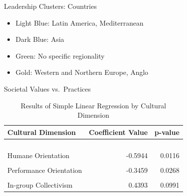 \documentclass[
  ignorenonframetext,
]{beamer}
\providecommand{\tightlist}{%
  \setlength{\itemsep}{0pt}\setlength{\parskip}{0pt}}
\begin{document}
\begin{frame}{Leadership Clusters: Countries}
\protect\hypertarget{leadership-clusters-countries-1}{}

\begin{itemize}
\tightlist
\item
  \textcolor{clust4}{Light Blue}: Latin America, Mediterranean
\item
  \textcolor{clust5}{Dark Blue}: Asia
\item
  \textcolor{clust6}{Green}: No specific regionality
\item
  \textcolor{clust7}{Gold}: Western and Northern Europe, Anglo
\end{itemize}
\end{frame}

\begin{frame}{Societal Values vs.~Practices}
\protect\hypertarget{societal-values-vs.-practices}{}
\begin{table}[!h]

\caption{\label{tab:SPV SLR Table}Results of Simple Linear Regression by Cultural Dimension}
\centering
\begin{tabular}[t]{lrr}
\toprule
Cultural Dimension & Coefficient Value & p-value\\
\midrule
\cellcolor[HTML]{E5F5E0}{Uncertainty Avoidance} & \cellcolor[HTML]{E5F5E0}{-0.6199} & \cellcolor[HTML]{E5F5E0}{0.0000}\\
\cellcolor[HTML]{E5F5E0}{Institutional Collectivism} & \cellcolor[HTML]{E5F5E0}{-0.5251} & \cellcolor[HTML]{E5F5E0}{0.0000}\\
\cellcolor[HTML]{E5F5E0}{Power Distance} & \cellcolor[HTML]{E5F5E0}{-0.4991} & \cellcolor[HTML]{E5F5E0}{0.0006}\\
\cellcolor[HTML]{E5F5E0}{Future Orientation} & \cellcolor[HTML]{E5F5E0}{-0.4725} & \cellcolor[HTML]{E5F5E0}{0.0009}\\
Humane Orientation & -0.5944 & 0.0116\\
\addlinespace
\cellcolor[HTML]{F0F0F0}{Gender Egalitarianism} & \cellcolor[HTML]{F0F0F0}{0.2437} & \cellcolor[HTML]{F0F0F0}{0.0124}\\
Performance Orientation & -0.3459 & 0.0268\\
\cellcolor[HTML]{F0F0F0}{Assertiveness} & \cellcolor[HTML]{F0F0F0}{-0.1507} & \cellcolor[HTML]{F0F0F0}{0.0414}\\
In-group Collectivism & 0.4393 & 0.0991\\
\bottomrule
\end{tabular}
\end{table}
\end{frame}
\end{document}
